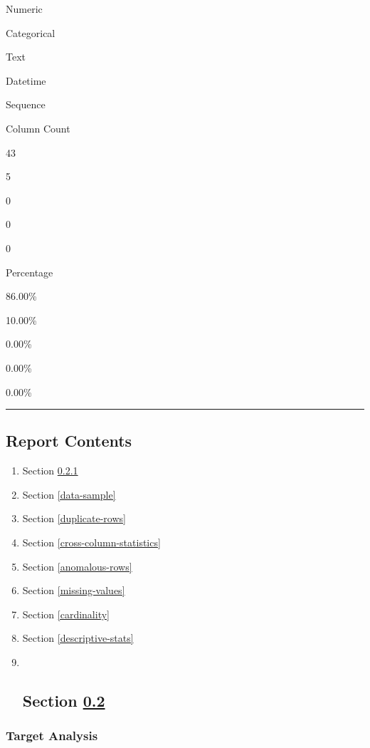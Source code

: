 \documentclass[11pt]{article}
\begin{document}
Numeric

Categorical

Text

Datetime

Sequence

Column Count

43

5

0

0

0

Percentage

86.00\%

10.00\%

0.00\%

0.00\%

0.00\%

\begin{center}\rule{0.5\linewidth}{0.5pt}\end{center}

\hypertarget{report-contents}{%
\subsection{Report Contents}\label{report-contents}}

\begin{enumerate}
\def\labelenumi{\arabic{enumi}.}
\item
  Section \ref{target-analysis}
\item
  Section \ref{data-sample}
\item
  Section \ref{duplicate-rows}
\item
  Section \ref{cross-column-statistics}
\item
  Section \ref{anomalous-rows}
\item
  Section \ref{missing-values}
\item
  Section \ref{cardinality}
\item
  Section \ref{descriptive-stats}
\item ~
  \hypertarget{definitions}{%
  \subsection{\texorpdfstring{Section \ref{definitions}}{ }}\label{definitions}}
\end{enumerate}

    \hypertarget{target-analysis}{%
\subsubsection{Target Analysis}\label{target-analysis}}
\end{document}
